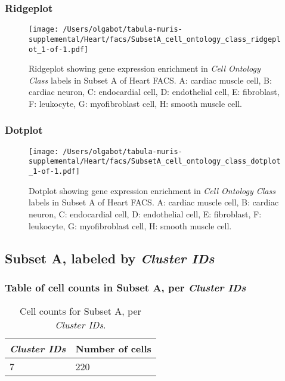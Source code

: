 \clearpage

\subsubsection{Ridgeplot}
\begin{figure}[h]
\centering
\texttt{[image: /Users/olgabot/tabula-muris-supplemental/Heart/facs/SubsetA\_cell\_ontology\_class\_ridgeplot\_1-of-1.pdf]}

\caption{ Ridgeplot  showing gene expression enrichment in \emph{Cell Ontology Class} labels in Subset A of Heart FACS. A: cardiac muscle cell, B: cardiac neuron, C: endocardial cell, D: endothelial cell, E: fibroblast, F: leukocyte, G: myofibroblast cell, H: smooth muscle cell.}
\end{figure}


\clearpage

\subsubsection{Dotplot}
\begin{figure}[h]
\centering
\texttt{[image: /Users/olgabot/tabula-muris-supplemental/Heart/facs/SubsetA\_cell\_ontology\_class\_dotplot\_1-of-1.pdf]}

\caption{ Dotplot  showing gene expression enrichment in \emph{Cell Ontology Class} labels in Subset A of Heart FACS. A: cardiac muscle cell, B: cardiac neuron, C: endocardial cell, D: endothelial cell, E: fibroblast, F: leukocyte, G: myofibroblast cell, H: smooth muscle cell.}
\end{figure}


\clearpage

\subsection{Subset A, labeled by \emph{Cluster IDs}}
\subsubsection{Table of cell counts in Subset A, per \emph{Cluster IDs}}\begin{table}[h]
\centering
\label{my-label}
\begin{tabular}{@{}ll@{}}
\toprule

\emph{Cluster IDs}& Number of cells \\ \midrule
7 & 220 \\
\bottomrule
\end{tabular}
\caption{Cell counts for Subset A, per \emph{Cluster IDs}.}
\end{table}

